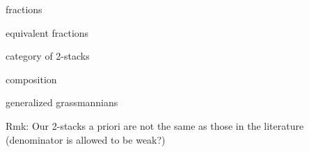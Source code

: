 %
%

\noi fractions

\bigskip

\noi equivalent fractions

\bigskip

\noi category of 2-stacks

\bigskip

\noi composition

\bigskip

\noi generalized grassmannians

\bigskip

\noi Rmk: Our 2-stacks a priori are not the same as those in the literature (denominator is allowed to be weak?)















